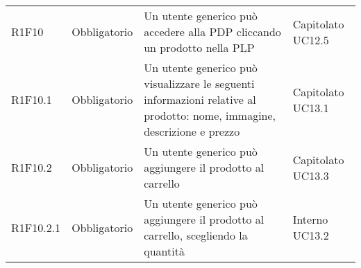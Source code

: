 {\begin{longtable}{C{2.5cm} C{2.8cm} C{6.7cm} C{2.5cm}}

R1F10 & Obbligatorio & Un utente generico può accedere alla PDP cliccando un prodotto nella PLP & Capitolato \newline UC12.5\\
R1F10.1 & Obbligatorio & Un utente generico può visualizzare le seguenti informazioni relative al prodotto: nome, immagine, descrizione e prezzo & Capitolato \newline UC13.1\\
R1F10.2 & Obbligatorio & Un utente generico può aggiungere il prodotto al carrello & Capitolato \newline UC13.3\\
R1F10.2.1 & Obbligatorio & Un utente generico può aggiungere il prodotto al carrello, scegliendo la quantità & Interno \newline UC13.2 \\

\end{longtable}

}